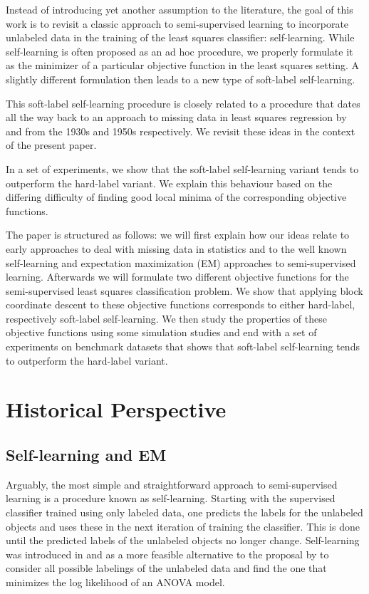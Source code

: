 \documentclass[twoside]{memoir}\usepackage[]{graphicx}\usepackage{xcolor}
\renewcommand{\cite}{\citep}
\begin{document}
Instead of introducing yet another assumption to the literature, the goal of this work is to revisit a classic approach to semi-supervised learning to incorporate unlabeled data in the training of the least squares classifier: self-learning. While self-learning is often proposed as an ad hoc procedure, we properly formulate it as the minimizer of a particular objective function in the least squares setting. A slightly different formulation then leads to a new type of soft-label self-learning. 

This soft-label self-learning procedure is closely related to a procedure that dates all the way back to an approach to missing data in least squares regression by \citet{Yates1933} and \citet{Healy1956} from the 1930s and 1950s respectively. We revisit these ideas in the context of the present paper.

In a set of experiments, we show that the soft-label self-learning variant tends to outperform the hard-label variant. We explain this behaviour based on the differing difficulty of finding good local minima of the corresponding objective functions. 

The paper is structured as follows: we will first explain how our ideas relate to early approaches to deal with missing data in statistics and to the well known self-learning and expectation maximization (EM) approaches to semi-supervised learning. Afterwards we will formulate two different objective functions for the semi-supervised least squares classification problem. We show that applying block coordinate descent \cite[Ch. 2.7]{Bertsekas1999} to these objective functions corresponds to either hard-label, respectively soft-label self-learning. We then study the properties of these objective functions using some simulation studies and end with a set of experiments on benchmark datasets that shows that soft-label self-learning tends to outperform the hard-label variant.

\section{Historical Perspective}

\subsection{Self-learning and EM}
Arguably, the most simple and straightforward approach to semi-supervised learning is a procedure known as self-learning. Starting with the supervised classifier trained using only labeled data, one predicts the labels for the unlabeled objects and uses these in the next iteration of training the classifier. This is done until the predicted labels of the unlabeled objects no longer change. Self-learning was introduced in \citet{McLachlan1975} and \citet{McLachlan1977} as a more feasible alternative to the proposal by \citet{Hartley1968b} to consider all possible labelings of the unlabeled data and find the one that minimizes the log likelihood of an ANOVA model.
\end{document}
